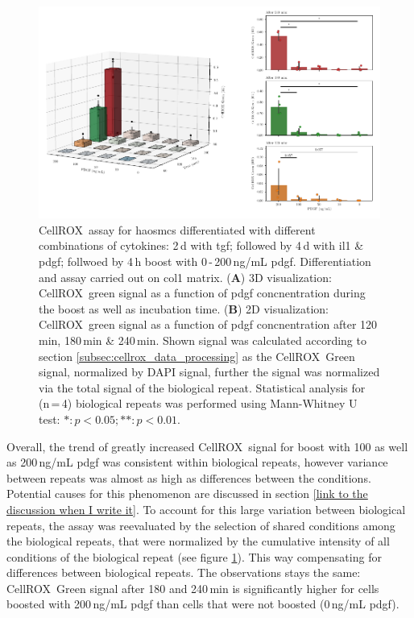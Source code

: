     \begin{figure}[h!]
    \capstart
        \centering
    	\includegraphics{Abbildung/CellROX_titration_norm.pdf}
    	\begin{minipage}{\captionwidth}
    		\caption[cellROX_titration_norm]{ \newline
            CellROX\texttrademark~assay for \acp{haosmc} differentiated with different combinations of cytokines: 2\,d with \ac{tgf}; followed by 4\,d with \ac{il1} \& \ac{pdgf}; follwoed by 4\,h boost with 0\,-\,200\,ng/mL \ac{pdgf}. Differentiation and assay carried out on \ac{col1} matrix.
            (\textbf{A}) 3D visualization: CellROX\texttrademark~green signal as a function of \ac{pdgf} concnentration during the boost as well as incubation time.
            (\textbf{B}) 2D visualization: CellROX\texttrademark~green signal as a function of \ac{pdgf} concnentration after 120\,min, 180\,min \& 240\,min.
            Shown signal was calculated according to section \ref{subsec:cellrox_data_processing} as the CellROX\texttrademark~Green signal, normalized by DAPI signal, further the signal was normalized via the total signal of the biological repeat. Statistical analysis for (n\,=\,4) biological repeats was performed using Mann-Whitney U test: $*: p < 0.05; **: p < 0.01$.}
    		\label{fig:cellROX_titration_norm}
    	\end{minipage}
    \end{figure}

    Overall, the trend of greatly increased CellROX\texttrademark~signal for boost with 100 as well as 200\,ng/mL \ac{pdgf} was consistent within biological repeats, however variance between repeats was almost as high as differences between the conditions. Potential causes for this phenomenon are discussed in section \ref{link to the discussion when I write it}. To account for this large variation between biological repeats, the assay was reevaluated by the selection of shared conditions among the biological repeats, that were normalized by the cumulative intensity of all conditions of the biological repeat (see figure \ref{fig:cellROX_titration_norm}). This way compensating for differences between biological repeats. The observations stays the same: CellROX\texttrademark~Green signal after 180 and 240\,min is significantly higher for cells boosted with 200\,ng/mL \ac{pdgf} than cells that were not boosted (0\,ng/mL \ac{pdgf}).

